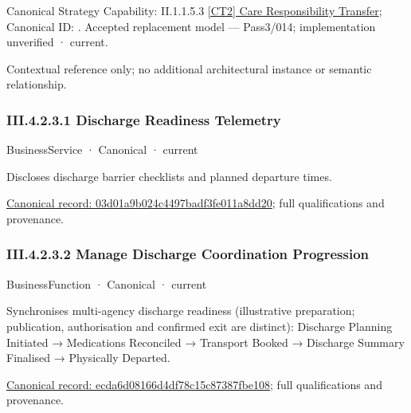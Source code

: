 {\small Canonical Strategy Capability: II.1.1.5.3 \hyperref[element:79d1b73313a04c10bdfa46fb47bd9473]{[CT2] Care Responsibility Transfer}; Canonical ID: \texttt{}. Accepted replacement model — Pass3/014; implementation unverified · current.}\par
Contextual reference only; no additional architectural instance or semantic relationship.\par
\subsubsection*{III.4.2.3.1 Discharge Readiness Telemetry}
\label{navigation:III.4.2.3.1}

\label{element:03d01a9b024c4497badf3fe011a8dd20}
{\small BusinessService · Canonical · current}\par

Discloses discharge barrier checklists and planned departure times.


{\footnotesize \href{../../../../../../../../continuum/business/business-service/03d01a9b024c4497badf3fe011a8dd20.md}{Canonical record: 03d01a9b024c4497badf3fe011a8dd20}; full qualifications and provenance.}\par
\subsubsection*{III.4.2.3.2 Manage Discharge Coordination Progression}
\label{navigation:III.4.2.3.2}

\label{element:ecda6d08166d4df78c15c87387fbe108}
{\small BusinessFunction · Canonical · current}\par

Synchronises multi-agency discharge readiness (illustrative preparation; publication, authorisation and confirmed exit are distinct): Discharge Planning Initiated → Medications Reconciled → Transport Booked → Discharge Summary Finalised → Physically Departed.


{\footnotesize \href{../../../../../../../../continuum/business/business-function/ecda6d08166d4df78c15c87387fbe108.md}{Canonical record: ecda6d08166d4df78c15c87387fbe108}; full qualifications and provenance.}\par

